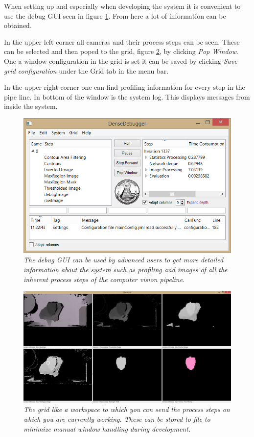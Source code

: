 
When setting up and especially when developing the system it is convenient to use the debug GUI seen in figure \ref{fig:debug GUI}. From here a lot of information can be obtained. 

In the upper left corner all cameras and their process steps can be seen. These can be selected and then poped to the grid, figure \ref{fig:grid}, by clicking \textit{Pop Window}. One a window configuration in the grid is set it can be saved by clicking \textit{Save grid configuration} under the Grid tab in the menu bar. 

In the upper right corner one can find profiling information for every step in the pipe line. In bottom of the window is the system log. This displays messages from inside the system. 

\begin{figure}[htb]
	\centering
	\includegraphics[width=\linewidth]{images/PosterDebugger.png}
	\caption[The debug GUI]
	{\textit{The debug GUI can be used by advanced users to get more detailed information about the system such as profiling and images of all the inherent process steps of the computer vision pipeline.}}
	\label{fig:debug GUI}  %
\end{figure}

\begin{figure}[htb]
	\centering
	\includegraphics[width=\linewidth]{images/TheGrid.png}
	\caption[The grid]
	{\textit{The grid like a workspace to which you can send the process steps on which you are currently working. These can be stored to file to minimize manual window handling during development.}}
	\label{fig:grid}  %
\end{figure}
